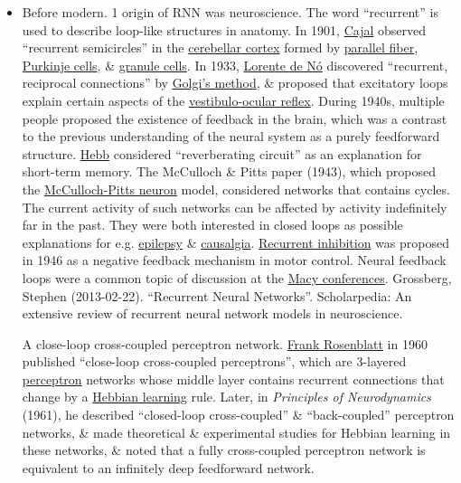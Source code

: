 \documentclass{article}
\begin{document}
\begin{itemize}
	\item {\sf Before modern.} 1 origin of RNN was neuroscience. The word ``recurrent'' is used to describe loop-like structures in anatomy. In 1901, \href{https://en.wikipedia.org/wiki/Santiago_Ram%C3%B3n_y_Cajal}{\sc Cajal} observed ``recurrent semicircles'' in the \href{https://en.wikipedia.org/wiki/Cerebellum}{cerebellar cortex} formed by \href{https://en.wikipedia.org/wiki/Parallel_fiber}{parallel fiber}, \href{https://en.wikipedia.org/wiki/Purkinje_cell}{Purkinje cells}, \& \href{https://en.wikipedia.org/wiki/Granule_cell}{granule cells}. In 1933, \href{https://en.wikipedia.org/wiki/Rafael_Lorente_de_N%C3%B3}{\sc Lorente de N\'o} discovered ``recurrent, reciprocal connections'' by \href{https://en.wikipedia.org/wiki/Golgi%27s_method}{Golgi's method}, \& proposed that excitatory loops explain certain aspects of the \href{https://en.wikipedia.org/wiki/Vestibulo%E2%80%93ocular_reflex}{vestibulo-ocular reflex}. During 1940s, multiple people proposed the existence of feedback in the brain, which was a contrast to the previous understanding of the neural system as a purely feedforward structure. \href{https://en.wikipedia.org/wiki/Donald_O._Hebb}{\sc Hebb} considered ``reverberating circuit'' as an explanation for short-term memory. The McCulloch \& Pitts paper (1943), which proposed the \href{https://en.wikipedia.org/wiki/McCulloch-Pitts_neuron}{McCulloch-Pitts neuron} model, considered networks that contains cycles. The current activity of such networks can be affected by activity indefinitely far in the past. They were both interested in closed loops as possible explanations for e.g. \href{https://en.wikipedia.org/wiki/Epilepsy}{epilepsy} \& \href{https://en.wikipedia.org/wiki/Complex_regional_pain_syndrome}{causalgia}. \href{https://en.wikipedia.org/wiki/Renshaw_cell}{Recurrent inhibition} was proposed in 1946 as a negative feedback mechanism in motor control. Neural feedback loops were a common topic of discussion at the \href{https://en.wikipedia.org/wiki/Macy_conferences}{Macy conferences}. Grossberg, Stephen (2013-02-22). ``Recurrent Neural Networks''. Scholarpedia: An extensive review of recurrent neural network models in neuroscience.
	
	{\sf A close-loop cross-coupled perceptron network.} \href{https://en.wikipedia.org/wiki/Frank_Rosenblatt}{\sc Frank Rosenblatt} in 1960 published ``close-loop cross-coupled perceptrons'', which are 3-layered \href{https://en.wikipedia.org/wiki/Perceptron}{perceptron} networks whose middle layer contains recurrent connections that change by a \href{https://en.wikipedia.org/wiki/Hebbian_theory}{Hebbian learning} rule. Later, in {\it Principles of Neurodynamics} (1961), he described ``closed-loop cross-coupled'' \& ``back-coupled'' perceptron networks, \& made theoretical \& experimental studies for Hebbian learning in these networks, \& noted that a fully cross-coupled perceptron network is equivalent to an infinitely deep feedforward network.
	

\end{itemize}
\end{document}
